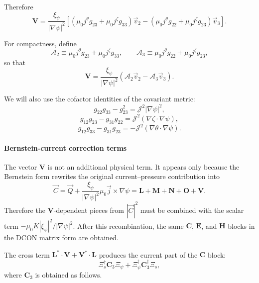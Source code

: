 \documentclass[10pt,a4paper]{article}
\numberwithin{equation}{section}
\begin{document}
Therefore
\begin{equation}
\boxed{
\mathbf V
=
\frac{\xi_\psi}{|\nabla\psi|^2}
\left[
(\mu_0j^\theta g_{23}+\mu_0j^\zeta g_{33})\vec v_2
-
(\mu_0j^\theta g_{22}+\mu_0j^\zeta g_{23})\vec v_3
\right].
}
\end{equation}

For compactness, define
\begin{equation}
\mathcal A_2 \equiv \mu_0j^\theta g_{23}+\mu_0j^\zeta g_{33},
\qquad
\mathcal A_3 \equiv \mu_0j^\theta g_{22}+\mu_0j^\zeta g_{23},
\end{equation}
so that
\begin{equation}
\mathbf V
=
\frac{\xi_\psi}{|\nabla\psi|^2}
\left(
\mathcal A_2 \vec v_2-\mathcal A_3 \vec v_3
\right).
\end{equation}

We will also use the cofactor identities of the covariant metric:
\begin{equation}
\boxed{
g_{22}g_{33}-g_{23}^2=\mathcal J^2|\nabla\psi|^2,
}
\end{equation}
\begin{equation}
\boxed{
g_{12}g_{23}-g_{31}g_{22}
=
\mathcal J^2(\nabla\zeta\cdot\nabla\psi),
}
\end{equation}
\begin{equation}
\boxed{
g_{12}g_{33}-g_{31}g_{23}
=
-\mathcal J^2(\nabla\theta\cdot\nabla\psi).
}
\end{equation}

\paragraph{Bernstein-current correction terms}

The vector $\mathbf V$ is not an additional physical term.  It appears only because the Bernstein form rewrites the original current--pressure contribution into
\[
\vec C=\vec Q+\frac{\xi_\psi}{|\nabla\psi|^2}\mu_0\vec j\times\nabla\psi
=\mathbf L+\mathbf M+\mathbf N+\mathbf O+\mathbf V.
\]
Therefore the $\mathbf V$-dependent pieces from $|\vec C|^2$ must be combined with the scalar term
$-\mu_0K|\xi_\psi|^2/|\nabla\psi|^2$.  After this recombination, the same $\mathbf C$, $\mathbf E$, and $\mathbf H$ blocks in the DCON matrix form are obtained.

The cross term $\mathbf L^* \cdot \mathbf V + \mathbf V^* \cdot \mathbf L$ produces the current part of the $\mathbf C$ block:
\[
\Xi_s^\dagger \mathbf C_3 \Xi_\psi + \Xi_\psi^\dagger \mathbf C_3^\dagger \Xi_s,
\]
where $\mathbf C_3$ is obtained as follows.
\end{document}
